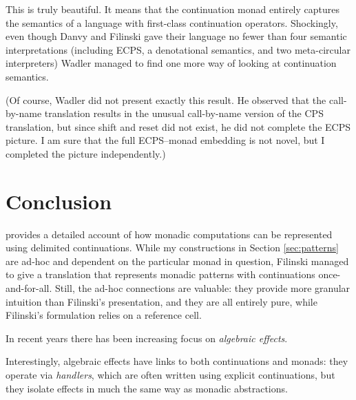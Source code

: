 \documentclass[acmsmall, nonacm, screen]{acmart}
\newif\ifdraft\drafttrue
\newcommand{\outline}[1]{
  \ifdraft
  {\color{red}{#1}}
  \fi
}
\begin{document}
This is truly beautiful. It means that the continuation monad entirely captures the semantics of
a language with first-class continuation operators. Shockingly, even though Danvy and Filinski
gave their language no fewer than four semantic interpretations (including ECPS, a denotational
semantics, and two meta-circular interpreters) Wadler managed to find one more way of looking at
continuation semantics.

(Of course, Wadler did not present exactly this result. He observed that the call-by-name
translation results in the unusual call-by-name version of the CPS translation, but since shift
and reset did not exist, he did not complete the ECPS picture. I am sure that the full ECPS--monad
embedding is not novel, but I completed the picture independently.)

\section{Conclusion} \label{sec:conclusion}
\outline{Start to wrap up...}

\citet{filinski1994representing} provides a detailed account of how monadic computations can be
represented using delimited continuations. While my constructions in Section \ref{sec:patterns}
are ad-hoc and dependent on the particular monad in question, Filinski managed to give a
translation that represents monadic patterns with continuations once-and-for-all. Still, the
ad-hoc connections are valuable: they provide more granular intuition than Filinski's
presentation, and they are all entirely pure, while Filinski's formulation relies on a reference
cell.

In recent years there has been increasing focus on {\em algebraic effects}.\outline{cite}
Interestingly, algebraic effects have links to both continuations and monads: they operate via
{\em handlers}, which are often written using explicit continuations, but they isolate effects in
much the same way as monadic abstractions.

\outline{Better ending}



\end{document}
